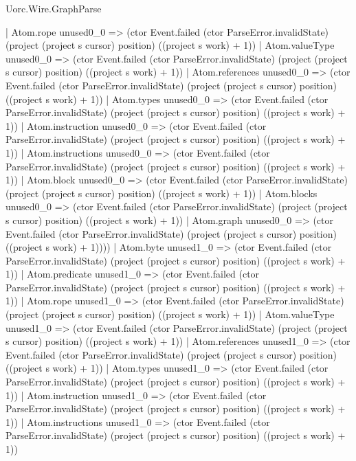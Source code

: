\begin{lexlean}{Uorc.Wire.GraphParse}
\begin{semanticmodule}
{              | Atom.rope unused0_0 => (ctor Event.failed (ctor ParseError.invalidState) (project (project s cursor) position) ((project s work) + 1))
              | Atom.valueType unused0_0 => (ctor Event.failed (ctor ParseError.invalidState) (project (project s cursor) position) ((project s work) + 1))
              | Atom.references unused0_0 => (ctor Event.failed (ctor ParseError.invalidState) (project (project s cursor) position) ((project s work) + 1))
              | Atom.types unused0_0 => (ctor Event.failed (ctor ParseError.invalidState) (project (project s cursor) position) ((project s work) + 1))
              | Atom.instruction unused0_0 => (ctor Event.failed (ctor ParseError.invalidState) (project (project s cursor) position) ((project s work) + 1))
              | Atom.instructions unused0_0 => (ctor Event.failed (ctor ParseError.invalidState) (project (project s cursor) position) ((project s work) + 1))
              | Atom.block unused0_0 => (ctor Event.failed (ctor ParseError.invalidState) (project (project s cursor) position) ((project s work) + 1))
              | Atom.blocks unused0_0 => (ctor Event.failed (ctor ParseError.invalidState) (project (project s cursor) position) ((project s work) + 1))
              | Atom.graph unused0_0 => (ctor Event.failed (ctor ParseError.invalidState) (project (project s cursor) position) ((project s work) + 1))))
          | Atom.byte unused1_0 => (ctor Event.failed (ctor ParseError.invalidState) (project (project s cursor) position) ((project s work) + 1))
          | Atom.predicate unused1_0 => (ctor Event.failed (ctor ParseError.invalidState) (project (project s cursor) position) ((project s work) + 1))
          | Atom.rope unused1_0 => (ctor Event.failed (ctor ParseError.invalidState) (project (project s cursor) position) ((project s work) + 1))
          | Atom.valueType unused1_0 => (ctor Event.failed (ctor ParseError.invalidState) (project (project s cursor) position) ((project s work) + 1))
          | Atom.references unused1_0 => (ctor Event.failed (ctor ParseError.invalidState) (project (project s cursor) position) ((project s work) + 1))
          | Atom.types unused1_0 => (ctor Event.failed (ctor ParseError.invalidState) (project (project s cursor) position) ((project s work) + 1))
          | Atom.instruction unused1_0 => (ctor Event.failed (ctor ParseError.invalidState) (project (project s cursor) position) ((project s work) + 1))
          | Atom.instructions unused1_0 => (ctor Event.failed (ctor ParseError.invalidState) (project (project s cursor) position) ((project s work) + 1))
}
\end{semanticmodule}
\end{lexlean}
